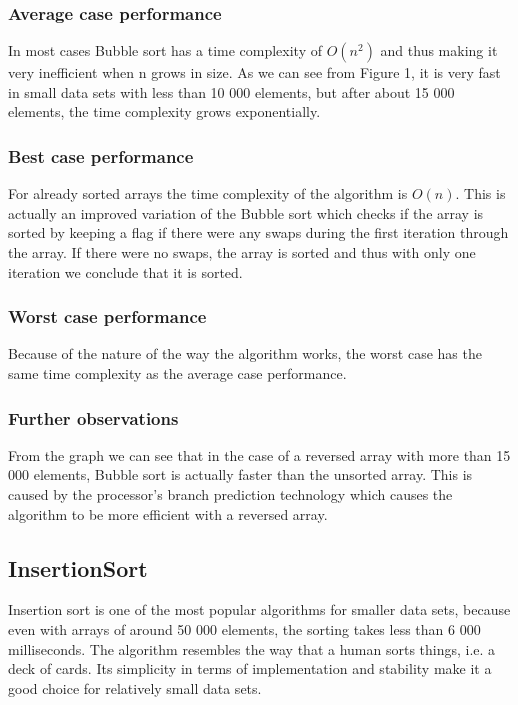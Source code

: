\documentclass{acm_proc_article-sp}
\begin{document}
\subsubsection{Average case performance}

In most cases Bubble sort has a time complexity of $O(n^{2})$ and thus making it very inefficient when n grows in size. As we can see from Figure 1, it is very fast in small data sets with less than 10 000 elements, but after about 15 000 elements, the time complexity grows exponentially.
\subsubsection{Best case performance}

For already sorted arrays the time complexity of the algorithm is $O(n)$. This is actually an improved variation of the Bubble sort which  checks if the array is sorted by keeping a flag if there were any swaps during the first iteration through the array. If there were no swaps, the array is sorted and thus with only one iteration we conclude that it is sorted.

\subsubsection{Worst case performance}

Because of the nature of the way the algorithm works, the worst case has the same time complexity as the average case performance.

\subsubsection{Further observations}

From the graph we can see that in the case of a reversed array with more than 15 000 elements, Bubble sort is actually faster than the unsorted array. This is caused by the processor's branch prediction technology which causes the algorithm to be more efficient with a reversed array.

\subsection{InsertionSort}

Insertion sort is one of the most popular algorithms for smaller data sets, because even with arrays of around 50 000 elements, the sorting takes less than 6 000 milliseconds. The algorithm resembles the way that a human sorts things, i.e. a deck of cards. Its simplicity in terms of implementation and stability make it a good choice for relatively small data sets.
\end{document}
